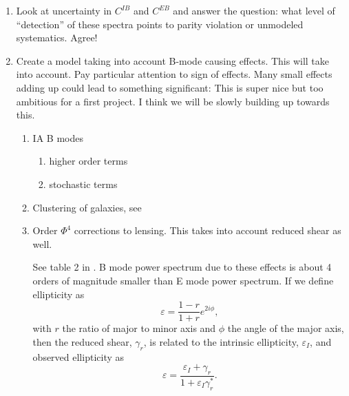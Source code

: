 \documentclass{article}
\begin{document}
\begin{enumerate}
\begin{enumerate}
        {\color{gray}
        Stitching together parts of the sky and removing parts introduces B-modes. TODO: read about why/how. TODO: check if cosmic rays get completely masked out. Maybe ask Henk?
        }
        \item non-uniform survey depth
        
        \item Any other systematics that can't be mitigated? (Ask postdoc)
    \end{enumerate}
    understand what causes the most noise / leakage. {\color{magenta}: Nice. This is better accomplished using image simulations. Each survey has simulation teams that work on producing something realistic. In Euclid I think there are efforts already. In LSST they are starting.}

    \item Look at uncertainty in $C^{IB}$ and $C^{EB}$ and answer the question: what level of ``detection'' of these spectra points to parity violation or unmodeled systematics. {\color{magenta} Agree!}
    
    \item Create a model taking into account B-mode causing effects. This will take into account. Pay particular attention to sign of effects. Many small effects adding up could lead to something significant: {\color{magenta} This is super nice but too ambitious for a first project. I think we will be slowly building up towards this.}
    \begin{enumerate}
        \item IA B modes
            \begin{enumerate}
                \item higher order terms
                \item stochastic terms
            \end{enumerate}
        \item Clustering of galaxies, see \cite{Schneider_2002}
        \item Order $\Phi^4$ corrections to lensing. This takes into account reduced shear as well.
        
        {\color{gray}
        See table 2 in \cite{Krause_2010}. B mode power spectrum due to these effects is about 4 orders of magnitude smaller than E mode power spectrum. If we define ellipticity as
        \begin{equation*}
            \varepsilon = \frac{1-r}{1+r}e^{2i\phi},
        \end{equation*}
        with $r$ the ratio of major to minor axis and $\phi$ the angle of the major axis, then the reduced shear, $\gamma_r$, is related to the intrinsic ellipticity, $\varepsilon_I$, and observed ellipticity as
        \begin{equation*}
            \varepsilon = \frac{\varepsilon_I + \gamma_r}{1+\varepsilon_I\gamma_r^*}.
        \end{equation*}}
        

\end{enumerate}
\end{enumerate}
\end{document}
